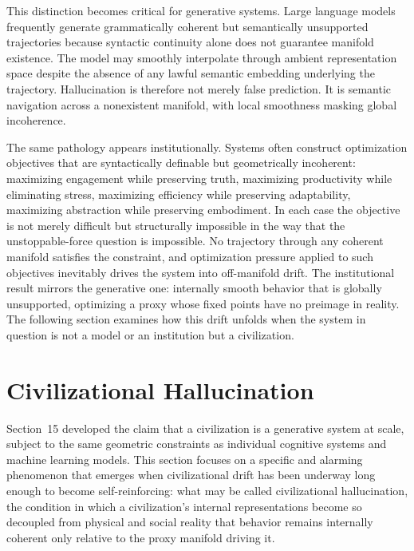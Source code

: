 \documentclass[11pt,a4paper,twocolumn]{article}
\begin{document}
This distinction becomes critical for generative systems. Large
language models frequently generate grammatically coherent but
semantically unsupported trajectories because syntactic
continuity alone does not guarantee manifold existence. The
model may smoothly interpolate through ambient representation
space despite the absence of any lawful semantic embedding
underlying the trajectory. Hallucination is therefore not
merely false prediction. It is semantic navigation across
a nonexistent manifold, with local smoothness masking global
incoherence.

The same pathology appears institutionally. Systems often
construct optimization objectives that are syntactically
definable but geometrically incoherent: maximizing engagement
while preserving truth, maximizing productivity while
eliminating stress, maximizing efficiency while preserving
adaptability, maximizing abstraction while preserving
embodiment. In each case the objective is not merely
difficult but structurally impossible in the way that the
unstoppable-force question is impossible. No trajectory
through any coherent manifold satisfies the constraint, and
optimization pressure applied to such objectives inevitably
drives the system into off-manifold drift. The institutional
result mirrors the generative one: internally smooth
behavior that is globally unsupported, optimizing a proxy
whose fixed points have no preimage in reality. The following
section examines how this drift unfolds when the system in
question is not a model or an institution but a civilization.


\section{Civilizational Hallucination}

Section~15 developed the claim that a civilization is a generative
system at scale, subject to the same geometric constraints as
individual cognitive systems and machine learning models. This
section focuses on a specific and alarming phenomenon that
emerges when civilizational drift has been underway long enough
to become self-reinforcing: what may be called civilizational
hallucination, the condition in which a civilization's internal
representations become so decoupled from physical and social
reality that behavior remains internally coherent only relative
to the proxy manifold driving it.
\end{document}
